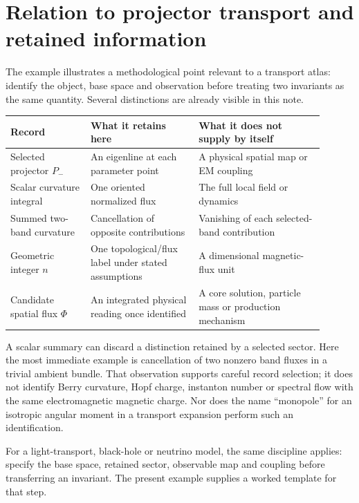 \documentclass[11pt]{article}
\theoremstyle{definition}\newtheorem{definition}[theorem]{Definition}
\theoremstyle{remark}\newtheorem{remark}[theorem]{Remark}
\begin{document}
\section{Relation to projector transport and retained information}
The example illustrates a methodological point relevant to a transport atlas: identify the object, base space and observation before treating two invariants as the same quantity. Several distinctions are already visible in this note.

\begin{center}\small
\begin{tabular}{p{0.23\linewidth}p{0.31\linewidth}p{0.36\linewidth}}
\toprule
Record & What it retains here & What it does not supply by itself\\\midrule
Selected projector $P_-$ & An eigenline at each parameter point & A physical spatial map or EM coupling\\
Scalar curvature integral & One oriented normalized flux & The full local field or dynamics\\
Summed two-band curvature & Cancellation of opposite contributions & Vanishing of each selected-band contribution\\
Geometric integer $n$ & One topological/flux label under stated assumptions & A dimensional magnetic-flux unit\\
Candidate spatial flux $\Phi$ & An integrated physical reading once identified & A core solution, particle mass or production mechanism\\\bottomrule
\end{tabular}
\end{center}
A scalar summary can discard a distinction retained by a selected sector. Here the most immediate example is cancellation of two nonzero band fluxes in a trivial ambient bundle. That observation supports careful record selection; it does not identify Berry curvature, Hopf charge, instanton number or spectral flow with the same electromagnetic magnetic charge. Nor does the name ``monopole'' for an isotropic angular moment in a transport expansion perform such an identification.

For a light-transport, black-hole or neutrino model, the same discipline applies: specify the base space, retained sector, observable map and coupling before transferring an invariant. The present example supplies a worked template for that step.
\end{document}
